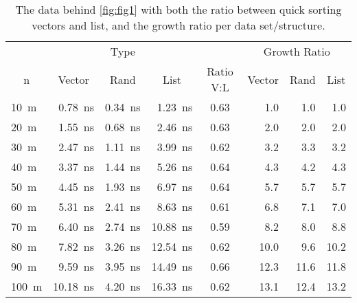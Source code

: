 \documentclass[a4paper, 11pt]{article}
\begin{document}
    \begin{table}[h]
        \centering
        \small
\begin{tabular}{lrrrcrrr}
    \toprule
            & \multicolumn{3}{c}{Type} && \multicolumn{3}{c}{Growth Ratio}\\
\cmidrule(lr){2-4}
\cmidrule(lr){6-8}
\multicolumn{1}{c}{n}& \multicolumn{1}{c}{Vector} & \multicolumn{1}{c}{Rand} & \multicolumn{1}{c}{List} & \multicolumn{1}{c}{Ratio V:L} & \multicolumn{1}{c}{Vector} & \multicolumn{1}{c}{Rand} & \multicolumn{1}{c}{List}\\
\cmidrule(lr){1-1}
\cmidrule(lr){2-4}
\cmidrule(lr){5-5}
\cmidrule(lr){6-8}

\SI{10 }{m} & \SI{0.78 }{\nano\second} & \SI{0.34}{\nano\second} & \SI{1.23 }{\nano\second} & \num{0.63} & \num{1.0}  & \num{1.0} & \num{1.0}  \\
\SI{20 }{m} & \SI{1.55 }{\nano\second} & \SI{0.68}{\nano\second} & \SI{2.46 }{\nano\second} & \num{0.63} & \num{2.0}  & \num{2.0} & \num{2.0}  \\
\SI{30 }{m} & \SI{2.47 }{\nano\second} & \SI{1.11}{\nano\second} & \SI{3.99 }{\nano\second} & \num{0.62} & \num{3.2}  & \num{3.3} & \num{3.2}  \\
\SI{40 }{m} & \SI{3.37 }{\nano\second} & \SI{1.44}{\nano\second} & \SI{5.26 }{\nano\second} & \num{0.64} & \num{4.3}  & \num{4.2} & \num{4.3}  \\
\SI{50 }{m} & \SI{4.45 }{\nano\second} & \SI{1.93}{\nano\second} & \SI{6.97 }{\nano\second} & \num{0.64} & \num{5.7}  & \num{5.7} & \num{5.7}  \\
\SI{60 }{m} & \SI{5.31 }{\nano\second} & \SI{2.41}{\nano\second} & \SI{8.63 }{\nano\second} & \num{0.61} & \num{6.8}  & \num{7.1} & \num{7.0}  \\
\SI{70 }{m} & \SI{6.40 }{\nano\second} & \SI{2.74}{\nano\second} & \SI{10.88}{\nano\second} & \num{0.59} & \num{8.2}  & \num{8.0} & \num{8.8}  \\
\SI{80 }{m} & \SI{7.82 }{\nano\second} & \SI{3.26}{\nano\second} & \SI{12.54}{\nano\second} & \num{0.62} & \num{10.0} & \num{9.6} & \num{10.2} \\
\SI{90 }{m} & \SI{9.59 }{\nano\second} & \SI{3.95}{\nano\second} & \SI{14.49}{\nano\second} & \num{0.66} & \num{12.3} & \num{11.6}& \num{11.8} \\
\SI{100}{m} & \SI{10.18}{\nano\second} & \SI{4.20}{\nano\second} & \SI{16.33}{\nano\second} & \num{0.62} & \num{13.1} & \num{12.4}& \num{13.2} \\
\bottomrule
\end{tabular}
    \caption{The data behind \autoref{fig:fig1} with both the ratio between
    quick sorting vectors and list, and the growth ratio per data
    set/structure.} %
    \label{tab:growth}
    \end{table}
\end{document}
